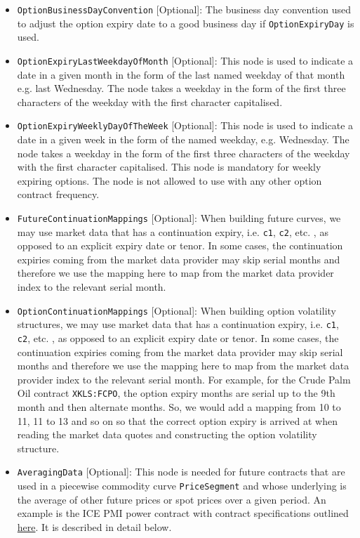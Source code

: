 \begin{itemize}
\item \lstinline!OptionBusinessDayConvention! [Optional]: The business day convention used to adjust the option expiry date to a good business day if \lstinline!OptionExpiryDay! is used.
\item \lstinline!OptionExpiryLastWeekdayOfMonth! [Optional]: This node is used to indicate a date in a given month in the form of the last named weekday of that month e.g. last Wednesday. The node takes a weekday in the form of the first three characters of the weekday with the first character capitalised.
\item \lstinline!OptionExpiryWeeklyDayOfTheWeek! [Optional]: This node is used to indicate a date in a given week in the form of the named weekday, e.g. Wednesday. The node takes a weekday in the form of the first three characters of the weekday with the first character capitalised. This node is mandatory for weekly expiring options. The node is not allowed to use with any other option contract frequency.
\item \lstinline!FutureContinuationMappings! [Optional]: When building future curves, we may use market data that has a continuation expiry, i.e. \lstinline!c1!, \lstinline!c2!, etc. , as opposed to an explicit expiry date or tenor. In some cases, the continuation expiries coming from the market data provider may skip serial months and therefore we use the mapping here to map from the market data provider index to the relevant serial month.
\item \lstinline!OptionContinuationMappings! [Optional]: When building option volatility structures, we may use market data that has a continuation expiry, i.e. \lstinline!c1!, \lstinline!c2!, etc. , as opposed to an explicit expiry date or tenor. In some cases, the continuation expiries coming from the market data provider may skip serial months and therefore we use the mapping here to map from the market data provider index to the relevant serial month. For example, for the Crude Palm Oil contract \lstinline!XKLS:FCPO!, the option expiry months are serial up to the 9th month and then alternate months. So, we would add a mapping from 10 to 11, 11 to 13 and so on so that the correct option expiry is arrived at when reading the market data quotes and constructing the option volatility structure.
\item \lstinline!AveragingData! [Optional]: This node is needed for future contracts that are used in a piecewise commodity curve \lstinline!PriceSegment! and whose underlying is the average of other future prices or spot prices over a given period. An example is the ICE PMI power contract with contract specifications outlined \href{https://www.theice.com/products/6590369/PJM-Western-Hub-Real-Time-Peak-1-MW-Fixed-Price-Future}{here}. It is described in detail below.

\end{itemize}

